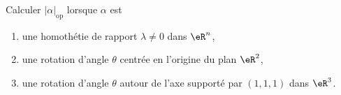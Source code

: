
\begin{exercice}\label{exoSerieDeux0002}

 Calculer $|\alpha|_{\mbox{op}}$ lorsque $\alpha$ est
\begin{enumerate}
	\item\label{ItemExoDeuxDeuxa} une homothétie de rapport $\lambda\neq0$ dans $\eR^n$,
	\item une rotation d'angle $\theta$ centrée en l'origine du plan $\eR^2$,
	\item une rotation d'angle $\theta$ autour de l'axe supporté par $(1,1,1)$ dans $\eR^3$.
\end{enumerate}

\end{exercice}

